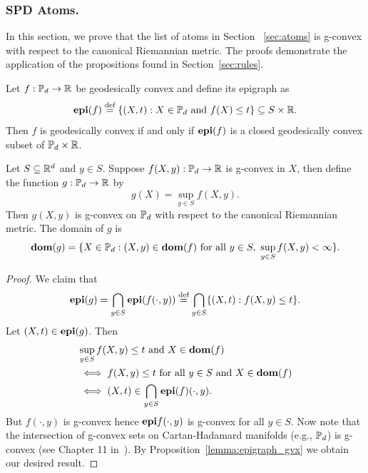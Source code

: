 \documentclass[twoside,11pt]{article}
\begin{document}
\subsubsection{SPD Atoms.}
In this section, we prove that the list of atoms in Section ~\ref{sec:atoms} is g-convex with respect to the canonical Riemannian metric. The proofs demonstrate the application of the propositions found in Section~\ref{sec:rules}. 


\begin{lemma}\label{lemma:epigraph_gvx}
    Let $f:\mathbb{P}_d \to \mathbb{R}$ be geodesically convex and define its epigraph as $$\textbf{epi}(f) \stackrel{\text{def}}{=} \{(X,t) : X \in \mathbb{P}_d \text{ and } f(X) \leq t\} \subseteq S \times \mathbb{R}.$$ Then $f$ is geodesically convex if and only if $\textbf{epi}(f)$ is a closed geodesically convex subset of $\mathbb{P}_d \times \mathbb{R}$.
\end{lemma}


\begin{prop}\label{prop:sup_gvx}
 Let $S\subseteq \mathbb{R}^d$ and  $y \in S$. Suppose $f(X,y): \mathbb{P}_d \to \mathbb{R}$ is g-convex in $X$, then define the function $g: \mathbb{P}_d \to \mathbb{R}$ by 
    \begin{equation*}
        g(X) = \sup_{y \in S}f(X,y).
    \end{equation*}
    Then $g(X,y)$ is g-convex on $\mathbb{P}_d$ with respect to the canonical Riemannian metric. The domain of $g$ is 
    \begin{equation*}
        \textbf{dom} (g) = \{X \in \mathbb{P}_d : (X,y) \in \textbf{dom}(f) \text{ for all } y \in S, \ \sup_{y \in S}f(X,y) < \infty\}.
    \end{equation*}   
\end{prop}

\begin{proof}
     We claim that 
    \begin{equation*}
        \textbf{epi}(g) = \bigcap_{y \in S}\textbf{epi}(f(\cdot, y)) \stackrel{\text{def}}{=} \bigcap_{y \in S}\{(X,t): f(X,y) \leq t\}.
    \end{equation*}
    Let $(X,t) \in \textbf{epi}(g)$. Then 
    \begin{align*}
        \begin{split}
            &\sup_{y \in S} f(X,y) \leq t \text{ and } X \in \textbf{dom}(f) 
            \\&\iff f(X,y) \leq t \text{ for all } y \in S  \text{ and } X \in \textbf{dom}(f) 
            \\&\iff (X,t) \in \bigcap_{y \in S} \textbf{epi}(f)(\cdot, y).
        \end{split}
    \end{align*} 
But $f(\cdot, y)$ is g-convex hence $\textbf{epi} f(\cdot, y)$ is g-convex for all $y \in S$. Now note that the intersection of g-convex sets on Cartan-Hadamard manifolds (e.g., $\mathbb{P}_d$) is g-convex (see Chapter 11 in~\citet{boumal2020introduction}). By Proposition~\ref{lemma:epigraph_gvx} we obtain our desired result. 
\end{proof}
 
\end{document}
